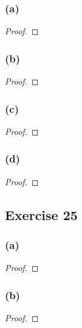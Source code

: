 \documentclass[14pt]{extarticle}
\begin{document}
\subsubsection{(a)}

\begin{proof}

\end{proof}

\subsubsection{(b)}

\begin{proof}

\end{proof}

\subsubsection{(c)}

\begin{proof}

\end{proof}

\subsubsection{(d)}

\begin{proof}

\end{proof}

\subsection{Exercise 25}

\subsubsection{(a)}

\begin{proof}

\end{proof}

\subsubsection{(b)}

\begin{proof}

\end{proof}
\end{document}
